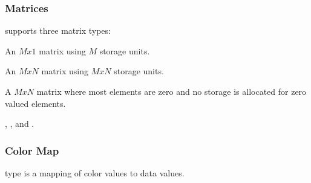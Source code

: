 
\subsubsection{Matrices}

\sr{} supports three matrix types: 

\begin{description}
 An \(Mx1\) matrix using \(M\)
storage units.

 An \(MxN\) matrix using \(MxN\)
storage units.

 A \(MxN\) matrix where most
elements are zero and no storage is allocated for zero valued
elements.
\end{description}

,
, and .

\subsubsection{Color Map}

\sr{}  type is a mapping of color values to data values.

